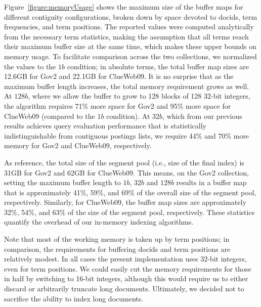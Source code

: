 Figure~\ref{figure:memoryUsage} shows the maximum size of the buffer maps for different contiguity configurations, broken down by space devoted to docids, term frequencies, and term positions. The reported values were computed analytically from the necessary term statistics, making the assumption that all terms reach their maximum buffer size at the same time, which makes these upper bounds on memory usage. To facilitate comparison across the two collections, we normalized the values to the $1b$ condition; in absolute terms, the total buffer map sizes are 12.6GB for Gov2 and 22.1GB for ClueWeb09. It is no surprise that as the maximum buffer length increases, the total memory requirement grows as well. At $128b$, where we allow the buffer to grow to 128 blocks of 128 32-bit integers, the algorithm requires 71\% more space for Gov2 and 95\% more space for ClueWeb09 (compared to the $1b$ condition). At $32b$, which from our previous results achieves query evaluation performance that is statistically 
indistinguishable from contiguous postings lists, we require 44\% and 70\% more memory for Gov2 and ClueWeb09, respectively.

As reference, the total size of the segment pool (i.e., size of the final index) is 31GB for Gov2 and 62GB for ClueWeb09. This means, on the Gov2 collection, setting the maximum buffer length to $1b$, $32b$ and $128b$ results in a buffer map that is approximately 41\%, 59\%, and 69\% of the overall size of the segment pool, respectively. Similarly, for ClueWeb09, the buffer map sizes are approximately 32\%, 54\%, and 63\% of the size of the segment pool, respectively. These statistics quantify the overhead of our in-memory indexing algorithms.

Note that most of the working memory is taken up by term positions; in comparison, the requirements for buffering docids and term positions are relatively modest. In all cases the present implementation uses 32-bit integers, even for term positions. We could easily cut the memory requirements for those in half by switching to 16-bit integers, although this would require us to either discard or arbitrarily truncate long documents. Ultimately, we decided not to sacrifice the ability to index long documents.

